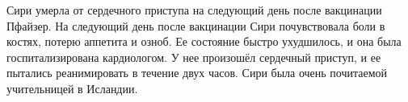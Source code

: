 \cyr
Сири умерла от сердечного приступа на следующий день после вакцинации
Пфайзер. На следующий день после вакцинации Сири почувствовала боли в костях,
потерю аппетита и озноб. Ее состояние быстро ухудшилось, и она была
госпитализирована кардиологом. У нее произошёл сердечный приступ, и ее пытались
реанимировать в течение двух часов. Сири была очень почитаемой учительницей в
Исландии.
